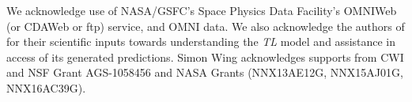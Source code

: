 \documentclass[referee,a4paper,12pt,traditabstract]{swsc}
\begin{document}
\begin{linenumbers}
\begin{acknowledgements}
      We acknowledge use of NASA/GSFC's Space Physics Data Facility's OMNIWeb (or CDAWeb or ftp) service, and OMNI data. We also acknowledge the authors of \citet{JGRA:JGRA16300} for their scientific inputs towards understanding the \emph{TL} model and assistance in access of its generated predictions. Simon Wing acknowledges supports from CWI and NSF Grant AGS-1058456 and NASA Grants (NNX13AE12G, NNX15AJ01G, NNX16AC39G).   
\end{acknowledgements}








\end{linenumbers}
\end{document}
